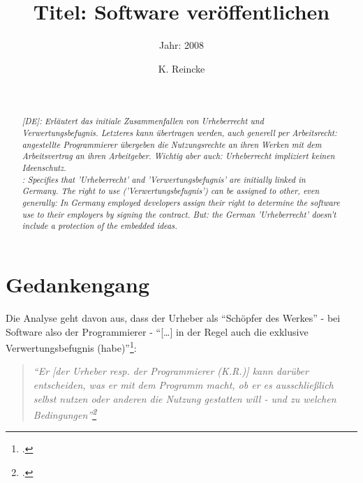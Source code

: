 \documentclass[DIV=calc,BCOR=5mm,11pt,headings=small,oneside,abstract=true, toc=bib]{scrartcl}
\begin{document}

\titlehead{Literaturexzerpt}
\subject{Autor(en): Kreutzer}
\title{Titel: Software veröffentlichen}
\subtitle{Jahr: 2008 }
\author{K. Reincke}
\maketitle

\begin{abstract}
\noindent
\cite[(in:)][]{DjoGehGraKreSpi2008a} \\
\noindent
\cite[(ist:)][163 - 167]{Kreutzer2008b} \\
\noindent \itshape
[DE]: Erläutert das initiale Zusammenfallen von Urheberrecht und
Verwertungsbefugnis. Letzteres kann übertragen werden, auch generell per
Arbeitsrecht: angestellte Programmierer übergeben die Nutzungsrechte an ihren
Werken mit dem Arbeitsvertrag an ihren Arbeitgeber. Wichtig aber auch:
Urheberrecht impliziert keinen Ideenschutz. \\
\noindent
[EN]: Specifies that 'Urheberrecht' and 'Verwertungsbefugnis' are initially
linked in Germany. The right to use ('Verwertungsbefugnis') can be assigned to
other, even generally: In Germany employed developers assign their right to
determine the software use to their employers by signing the contract. But: the
German 'Urheberrecht' doesn't include a protection of the embedded ideas.
\end{abstract}
\footnotesize
\normalsize

\section{Gedankengang}

Die Analyse geht davon aus, dass der Urheber als \enquote{Schöpfer des
Werkes} - bei Software also der Programmierer - \enquote{[\ldots] in der
Regel auch die exklusive Verwertungsbefugnis
(habe)}\footcite[vgl.][163]{Kreutzer2008b}:

\begin{quote}{\itshape \enquote{Er [der Urheber resp. der Programmierer (K.R.)]
kann darüber entscheiden, was er mit dem Programm macht, ob er es ausschließlich
selbst nutzen oder anderen die Nutzung gestatten will - und zu welchen
Bedingungen}\footcite[][163]{Kreutzer2008b}}\end{quote}
\end{document}
